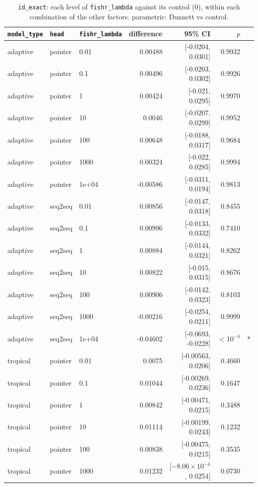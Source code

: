 \documentclass[10pt]{article}
\begin{document}
{\small
\begin{longtable}{lllrrrl}
\caption{\texttt{id\_exact}: each level of \texttt{fishr\_lambda} against its control (0), within each combination of the other factors. parametric: Dunnett vs control.}\label{tab:control-id_exact}\\
\toprule
\texttt{model\_type} & \texttt{head} & \texttt{fishr\_lambda} & difference & 95\% CI & $p$ & \\
\midrule
\endhead
adaptive & pointer & 0.01 & 0.00488 & [-0.0204, 0.0301] & 0.9932 & \\
adaptive & pointer & 0.1 & 0.00496 & [-0.0203, 0.0302] & 0.9926 & \\
adaptive & pointer & 1 & 0.00424 & [-0.021, 0.0295] & 0.9970 & \\
adaptive & pointer & 10 & 0.0046 & [-0.0207, 0.0299] & 0.9952 & \\
adaptive & pointer & 100 & 0.00648 & [-0.0188, 0.0317] & 0.9684 & \\
adaptive & pointer & 1000 & 0.00324 & [-0.022, 0.0285] & 0.9994 & \\
adaptive & pointer & 1e+04 & -0.00586 & [-0.0311, 0.0194] & 0.9813 & \\
adaptive & seq2seq & 0.01 & 0.00856 & [-0.0147, 0.0318] & 0.8455 & \\
adaptive & seq2seq & 0.1 & 0.00996 & [-0.0133, 0.0332] & 0.7410 & \\
adaptive & seq2seq & 1 & 0.00884 & [-0.0144, 0.0321] & 0.8262 & \\
adaptive & seq2seq & 10 & 0.00822 & [-0.015, 0.0315] & 0.8676 & \\
adaptive & seq2seq & 100 & 0.00906 & [-0.0142, 0.0323] & 0.8103 & \\
adaptive & seq2seq & 1000 & -0.00216 & [-0.0254, 0.0211] & 0.9999 & \\
adaptive & seq2seq & 1e+04 & -0.04602 & [-0.0693, -0.0228] & $<10^{-4}$ & *\\
tropical & pointer & 0.01 & 0.0075 & [-0.00563, 0.0206] & 0.4660 & \\
tropical & pointer & 0.1 & 0.01044 & [-0.00269, 0.0236] & 0.1647 & \\
tropical & pointer & 1 & 0.00842 & [-0.00471, 0.0215] & 0.3488 & \\
tropical & pointer & 10 & 0.01114 & [-0.00199, 0.0243] & 0.1232 & \\
tropical & pointer & 100 & 0.00838 & [-0.00475, 0.0215] & 0.3535 & \\
tropical & pointer & 1000 & 0.01232 & [$-8.06\times10^{-4}$, 0.0254] & 0.0730 & \\

\end{longtable}}
\end{document}
